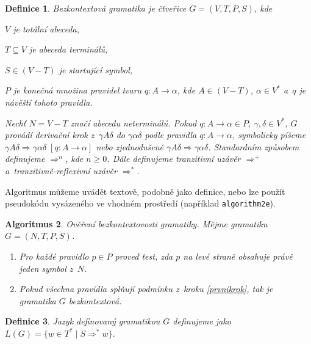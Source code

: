 \documentclass[11pt,a4paper,twocolumn]{article}
\newtheorem{definice}{Definice}[section]
\newtheorem{algoritmus}[definice]{Algoritmus}
\begin{document}
  \begin{definice}\label{bezkontextgram}
    \emph{Bezkontextová gramatika} je čtveřice $G=(V,T,P,S)$, kde
    \begin{description*}
      \item[$V$] je totální abeceda,
      \item[$T\subseteq V$] je abeceda terminálů,
      \item[$S\in(V-T)$] je startující symbol,
      \item[$P$] je konečná množina \emph{pravidel} tvaru $q\colon A\rightarrow \alpha$,
        kde $A\in(V-T)$, $\alpha\in V^*$ a~$q$ je návěští tohoto pravidla.
    \end{description*}
    Nechť $N = V - T$ značí abecedu neterminálů. Pokud $q \colon A \rightarrow \alpha
    \in P$, $\gamma, \delta \in V^*$, $G$ provádí derivační krok z~$\gamma A \delta$
    do $\gamma \alpha \delta$ podle pravidla $q \colon A \rightarrow \alpha$, symbolicky
    píšeme $\gamma A \delta \Rightarrow \gamma \alpha \delta \; [q \colon A \rightarrow
    \alpha]$ nebo zjednodušeně $\gamma A \delta \Rightarrow \gamma \alpha \delta$.
    Standardním způsobem definujeme $\Rightarrow^n$, kde $n \geq 0$. Dále definujeme
    tranzitivní uzávěr $\Rightarrow^+$ a~tranzitivně-reflexivní uzávěr $\Rightarrow^*$.
  \end{definice}

  Algoritmus můžeme uvádět textově, podobně jako definice, nebo lze použít pseudokódu
  vysázeného ve vhodném prostředí (například \texttt{algorithm2e}).

  \begin{algoritmus}
    \emph{Ověření bezkontextovosti gramatiky}. Mějme gramatiku $G=(N,T,P,S)$.
    \begin{enumerate}
      \item \label{prvnikrok}Pro každé pravidlo $p \in P$ proveď test, zda $p$ na levé
        straně obsahuje právě jeden symbol z~$N$.
      \item Pokud všechna pravidla splňují podmínku z~kroku \ref{prvnikrok}, tak je
        gramatika $G$ bezkontextová.
    \end{enumerate}
  \end{algoritmus}

  \begin{definice}
    \emph{Jazyk} definovaný gramatikou $G$ definujeme jako $L(G) = \{ w \in T^* \; | \;
    S \Rightarrow^* w \}$.
  \end{definice}
\end{document}

